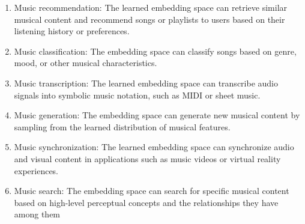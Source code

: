 \begin{enumerate}
\item Music recommendation: The learned embedding space can retrieve similar musical content and recommend songs or playlists to users based on their listening history or preferences.
\item Music classification: The embedding space can classify songs based on genre, mood, or other musical characteristics.
\item Music transcription: The learned embedding space can transcribe audio signals into symbolic music notation, such as MIDI or sheet music.
\item Music generation: The embedding space can generate new musical content by sampling from the learned distribution of musical features.
\item Music synchronization: The learned embedding space can synchronize audio and visual content in applications such as music videos or virtual reality experiences.
\item Music search: The embedding space can search for specific musical content based on high-level perceptual concepts and the relationships they have among them
\end{enumerate}

